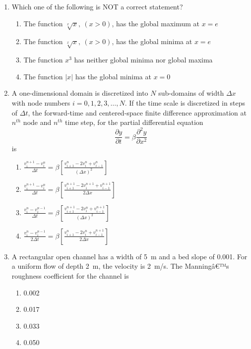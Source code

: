 \documentclass[12pt]{article}
\begin{document}
\begin{enumerate}[label= Q.\arabic*,start =26]
	\item Which one of the following is NOT a correct statement?

		\begin{enumerate}[label=(\Alph*)]
			\item The function $\sqrt[x]{x},~(x > 0)$, has the global maximum at $x = e$
			\item The function $\sqrt[x]{x},~(x > 0)$, has the global minima at $x = e$
			\item The function $x^3$ has neither global minima nor global maxima
			\item The function $|x|$ has the global minima at $x = 0$
		\end{enumerate}


	\item A one-dimensional domain is discretized into $N$ sub-domains of width $\Delta x$ with node numbers $i = 0, 1, 2, 3, \ldots, N$. If the time scale is discretized in steps of $\Delta t$, the forward-time and centered-space finite difference approximation at $n^{th}$ node and $n^{th}$ time step, for the partial differential equation
		\[
			\frac{\partial y}{\partial t} = \beta \frac{\partial^2 y}{\partial x^2}
		\]
		is

		\begin{enumerate}[label=(\Alph*)]
			\item $\frac{v_i^{n+1} - v_i^n}{\Delta t} = \beta \left[ \frac{v_{i+1}^n - 2v_i^n + v_{i-1}^n}{(\Delta x)^2} \right]$
			\item $\frac{v_i^{n+1} - v_i^n}{\Delta t} = \beta \left[ \frac{v_{i+1}^{n+1} - 2v_i^{n+1} + v_{i-1}^{n+1}}{2\Delta x} \right]$
			\item $\frac{v_i^{n} - v_i^{n-1}}{\Delta t} = \beta \left[ \frac{v_{i+1}^{n+1} - 2v_i^n + v_{i-1}^{n+1}}{(\Delta x)^2} \right]$
			\item $\frac{v_i^{n} - v_i^{n-1}}{2 \Delta t} = \beta \left[ \frac{v_{i+1}^n - 2v_i^n + v_{i-1}^{n+1}}{2 \Delta x} \right]$
		\end{enumerate}

	\item A rectangular open channel has a width of 5~m and a bed slope of 0.001. For a uniform flow of depth 2~m, the velocity is 2~m/s. The Manningâ€™s roughness coefficient for the channel is

		\begin{multicols}{4}
			\begin{enumerate}[label=(\Alph*)]
				\item 0.002  
				\item 0.017  
				\item 0.033  
				\item 0.050  
			\end{enumerate}
		\end{multicols}



\end{enumerate}
\end{document}
